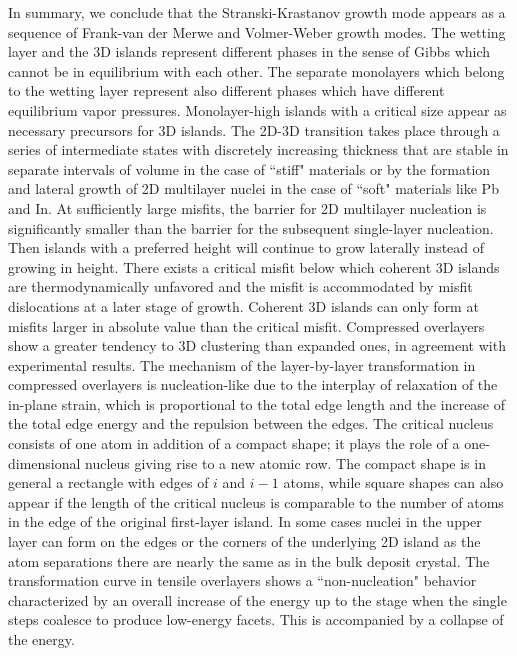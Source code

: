 \documentclass[aps,prl,showpacs,twocolumn,byrevtex,floatfix]{revtex4-1}
\begin{document}
In summary, we conclude that the Stranski-Krastanov growth mode appears as a
sequence of Frank-van der Merwe and Volmer-Weber growth modes. The wetting layer
and the 3D islands represent different phases in the sense of Gibbs which cannot
be in equilibrium with each other. The separate monolayers which belong to the
wetting layer represent also different phases which have different equilibrium
vapor pressures. Monolayer-high islands with a critical size appear as necessary
precursors for 3D islands. The 2D-3D transition takes place through a series of
intermediate states with discretely increasing thickness that are stable in
separate intervals of volume in the case of ``stiff" materials or by the
formation and lateral growth of 2D multilayer nuclei in the case of ``soft"
materials like Pb and In. At sufficiently large misfits, the barrier for 2D
multilayer nucleation is significantly smaller than the barrier for the
subsequent single-layer nucleation. Then islands with a preferred height will
continue to grow laterally instead of growing in height. 
There exists a critical misfit
below which coherent 3D islands are thermodynamically unfavored and the misfit
is accommodated by misfit dislocations at a later stage of growth. Coherent 3D
islands can only form at misfits larger in absolute value than the critical
misfit. Compressed overlayers show a greater tendency to 3D clustering than
expanded ones, in agreement with experimental results. The mechanism of the
layer-by-layer transformation in compressed overlayers is nucleation-like due to
the interplay of relaxation of the in-plane strain, which is proportional to the
total edge length and the increase of the total edge energy and the repulsion
between the edges. The critical nucleus consists of one atom in addition of a
compact shape; it plays the role of a one-dimensional nucleus giving rise to a
new atomic row. The compact shape is in general a rectangle with edges of $i$
and $i - 1$ atoms, while square shapes can also appear if the length of the
critical nucleus is comparable to the number of atoms in the edge of the
original first-layer island. In some cases nuclei in the upper layer can form
on the edges or the corners of the underlying 2D island as the atom separations
there are nearly the same as in the bulk deposit crystal. The transformation
curve in tensile overlayers shows a ``non-nucleation" behavior characterized by
an overall increase of the energy up to the stage when the single steps coalesce
to produce low-energy facets. This is accompanied by a collapse of the energy.
\end{document}

